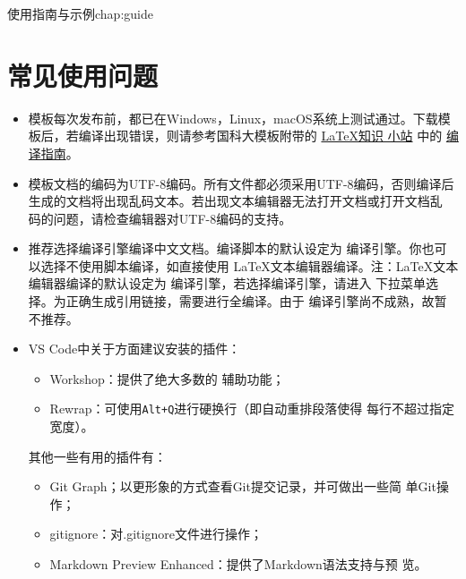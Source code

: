 \begin{cuzchapter}{使用指南与示例}{chap:guide}
    \section{常见使用问题}\label{sec:qa}

    \begin{itemize}
        \item 模板每次发布前，都已在Windows，Linux，macOS系统上测试通过。下载模
              板后，若编译出现错误，则请参考国科大模板附带的
              \href{https://github.com/mohuangrui/ucasthesis/wiki}{\LaTeX{}知识
                  小站} 中的
              \href{https://github.com/mohuangrui/ucasthesis/wiki/%E7%BC%96%E8%AF%91%E6%8C%87%E5%8D%97}{编
                  译指南}。
        \item 模板文档的编码为UTF-8编码。所有文件都必须采用UTF-8编码，否则编译后
              生成的文档将出现乱码文本。若出现文本编辑器无法打开文档或打开文档乱
              码的问题，请检查编辑器对UTF-8编码的支持。
        \item 推荐选择编译引擎编译中文文档。编译脚本的默认设定为
              编译引擎。你也可以选择不使用脚本编译，如直接使用
              \LaTeX{}文本编辑器编译。注：\LaTeX{}文本编辑器编译的默认设定为
              编译引擎，若选择编译引擎，请进入
              下拉菜单选择。为正确生成引用链接，需要进行全编译。由于
              编译引擎尚不成熟，故暂不推荐。
        \item VS Code中关于方面建议安装的插件：
              \begin{itemize}
                  \item {} Workshop：提供了绝大多数的
                        辅助功能；
                  \item Rewrap：可使用\verb|Alt+Q|进行硬换行（即自动重排段落使得
                        每行不超过指定宽度）。
              \end{itemize}
              其他一些有用的插件有：
              \begin{itemize}
                  \item Git Graph；以更形象的方式查看Git提交记录，并可做出一些简
                        单Git操作；
                  \item gitignore：对.gitignore文件进行操作；
                  \item Markdown Preview Enhanced：提供了Markdown语法支持与预
                        览。
              \end{itemize}

\end{itemize}
\end{cuzchapter}
